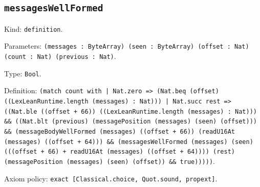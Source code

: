 \documentclass[11pt]{article}
\begin{document}
\subsection*{\texttt{messagesWellFormed}}
\noindent Kind: \texttt{definition}.\par
\noindent Parameters: \texttt{(messages : ByteArray) (seen : ByteArray) (offset : Nat) (count : Nat) (previous : Nat)}.\par
\noindent Type: \texttt{Bool}.\par
\noindent Definition: \texttt{(match count with | Nat.zero => (Nat.beq (offset) ((LexLeanRuntime.length (messages) : Nat))) | Nat.succ rest => ((Nat.ble ((offset + 66)) ((LexLeanRuntime.length (messages) : Nat))) \&\& ((Nat.blt (previous) (messagePosition (messages) (seen) (offset))) \&\& (messageBodyWellFormed (messages) ((offset + 66)) (readU16At (messages) ((offset + 64))) \&\& (messagesWellFormed (messages) (seen) (((offset + 66) + readU16At (messages) ((offset + 64)))) (rest) (messagePosition (messages) (seen) (offset)) \&\& true)))))}.\par
\noindent Axiom policy: \texttt{exact [Classical.choice, Quot.sound, propext]}.\par
\end{document}
